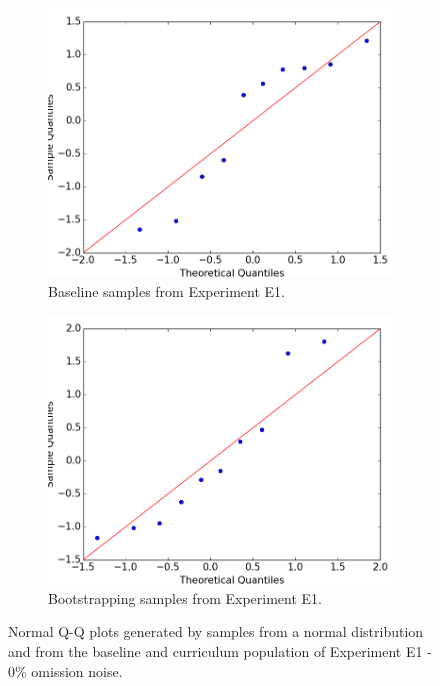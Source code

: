 \begin{figure}
\begin{subfigure}{0.38\textwidth}
\includegraphics[width=\linewidth]{figs/normality/10samples_baseline2.png}
\caption{Baseline samples from Experiment E1.} \label{fig:normality_baseline}
\end{subfigure}
\hspace*{\fill} %
\begin{subfigure}{0.38\textwidth}
\includegraphics[width=\linewidth]{figs/normality/10samples_bootstrapping2.png}
\caption{Bootstrapping samples from Experiment E1.} \label{fig:normality_bootstrapping}
\end{subfigure}
\caption[Normal Q-Q plot examples]{Normal Q-Q plots generated by samples from a normal distribution and from the baseline and curriculum population of Experiment E1 - 0\% omission noise. } \label{fig:normalityqq}
\end{figure}

